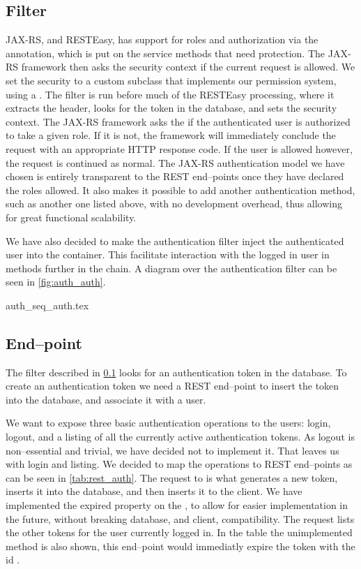 \subsection{Filter}
\label{subsec:auth_filter}

JAX-RS, and RESTEasy, has support for roles and authorization via the
 annotation, which is put on the service methods that need
protection. The JAX-RS framework then asks the security context if the current
request is allowed. We set the security to a custom subclass that implements our
permission system, using a . The filter is run
before much of the RESTEasy processing, where it extracts the header, looks for
the token in the database, and sets the security context. The JAX-RS framework
asks the  if the authenticated user is authorized to take
a given role. If it is not, the framework will immediately conclude the request
with an appropriate HTTP response code. If the user is allowed however, the
request is continued as normal. The JAX-RS authentication model we have chosen
is entirely transparent to the REST end--points once they have declared the roles
allowed. It also makes it possible to add another authentication method, such as
another one listed above, with no development overhead, thus allowing for great
functional scalability.

We have also decided to make the authentication filter inject the authenticated
user into the container. This facilitate interaction with the logged in user in
methods further in the chain. A diagram over the authentication filter can be
seen in \cref{fig:auth_auth}.

{auth_seq_auth.tex}

\subsection{End--point}
The filter described in \cref{subsec:auth_filter} looks for an authentication
token in the database. To create an authentication token we need a REST end--point
to insert the token into the database, and associate it with a user.

We want to expose three basic authentication operations to the users: login, logout,
and a listing of all the currently active authentication tokens. As logout is
non--essential and trivial, we have decided not to implement it. That leaves us
with login and listing. We decided to map the operations to REST end--points as
can be seen in \cref{tab:rest_auth}. The  request to  is
what generates a new token, inserts it into the database, and then inserts it to
the client. We have implemented the expired property on the , to
allow for easier implementation in the future, without breaking database, and
client, compatibility. The  request lists the other tokens for the
user currently logged in. In the table the unimplemented  method is
also shown, this end--point would immediatly expire the token with the id
.

